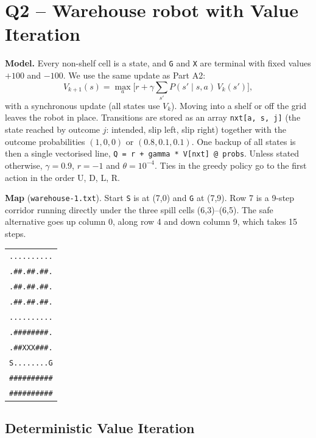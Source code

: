 \documentclass[10.5pt]{article}
\begin{document}
\section{Q2 -- Warehouse robot with Value Iteration}

\textbf{Model.} Every non-shelf cell is a state, and \texttt{G} and \texttt{X} are terminal with fixed values $+100$ and $-100$.
We use the same update as Part A2:
\[
V_{k+1}(s)=\max_a\Big[r+\gamma\sum_{s'}P(s'\mid s,a)\,V_k(s')\Big],
\]
with a synchronous update (all states use $V_k$). Moving into a shelf or off the grid leaves the robot in place.
Transitions are stored as an array \texttt{nxt[a, s, j]} (the state reached by outcome $j$: intended, slip left, slip right)
together with the outcome probabilities $(1,0,0)$ or $(0.8,0.1,0.1)$. One backup of all states is then a single
vectorised line, \texttt{Q = r + gamma * V[nxt] @ probs}. Unless stated otherwise, $\gamma=0.9$, $r=-1$ and
$\theta=10^{-4}$. Ties in the greedy policy go to the first action in the order U, D, L, R.

\textbf{Map} (\texttt{warehouse-1.txt}). Start \texttt{S} is at (7,0) and \texttt{G} at (7,9). Row 7 is a 9-step corridor running
directly under the three spill cells (6,3)--(6,5). The safe alternative goes up column 0, along row 4 and down
column 9, which takes 15 steps.
\begin{center}\small
\begin{tabular}{c}
\texttt{..........}\\[-2pt]
\texttt{.\#\#.\#\#.\#\#.}\\[-2pt]
\texttt{.\#\#.\#\#.\#\#.}\\[-2pt]
\texttt{.\#\#.\#\#.\#\#.}\\[-2pt]
\texttt{..........}\\[-2pt]
\texttt{.\#\#\#\#\#\#\#\#.}\\[-2pt]
\texttt{.\#\#XXX\#\#\#.}\\[-2pt]
\texttt{S........G}\\[-2pt]
\texttt{\#\#\#\#\#\#\#\#\#\#}\\[-2pt]
\texttt{\#\#\#\#\#\#\#\#\#\#}
\end{tabular}
\end{center}

\subsection{Deterministic Value Iteration}
\end{document}
